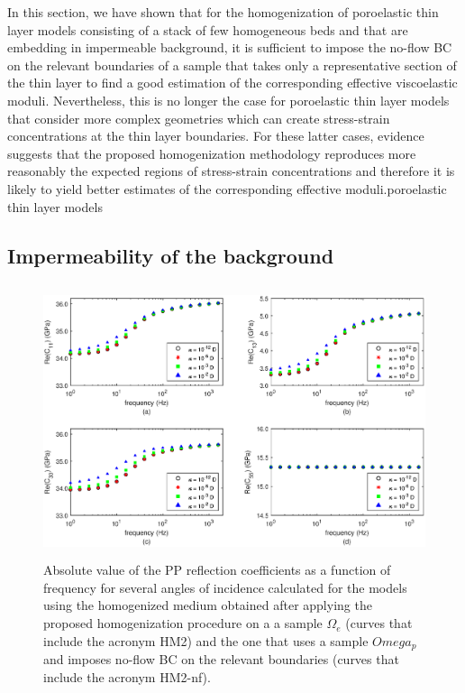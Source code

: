 \documentclass[draft]{agujournal2019}
\begin{document}
In this section, we have shown that for the homogenization of poroelastic thin layer models consisting of a stack of few homogeneous beds and that are embedding in impermeable background, it is sufficient to impose the no-flow BC on the relevant boundaries of a sample that takes only a representative section of the thin layer to find a good estimation of the corresponding effective viscoelastic moduli. Nevertheless, this is no longer the case for poroelastic thin layer models that consider more complex geometries which can create stress-strain concentrations at the thin layer boundaries. For these latter cases, evidence suggests that the proposed homogenization methodology reproduces more reasonably the expected regions of  stress-strain concentrations and therefore it is likely to yield better estimates of the corresponding effective moduli.poroelastic thin layer models

\subsection{Impermeability of the background}

\begin{figure}[!ht]
\centering
        \includegraphics[width= 120mm, height=80mm]{cijkbg_2sandshale.eps}
\caption{ Absolute value of the PP reflection coefficients as a function of frequency for several angles of incidence calculated for the models using the homogenized medium obtained after applying the proposed homogenization procedure on a a sample $\Omega_e $ (curves that include the acronym HM2) and the one that uses a sample $Omega_p$ and imposes no-flow BC on the relevant boundaries (curves that include the acronym HM2-nf).}
\label{fig.10}
\end{figure}
\end{document}
